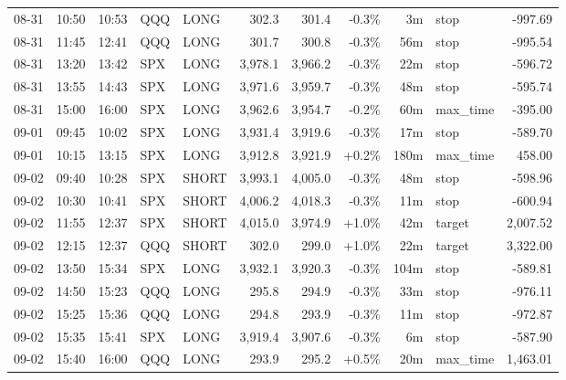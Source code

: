 \documentclass[11pt,a4paper,twoside]{article}
\begin{document}
\begin{center}
\begin{longtable}{>{\color{txtmain}}l l l l l r r r r >{\color{txtmain}}l r}
08-31 & 10:50 & 10:53 & QQQ & LONG & 302.3 & 301.4 & \textcolor{lossred}{-0.3\%} & 3m & stop & \textcolor{lossred}{-997.69} \\
08-31 & 11:45 & 12:41 & QQQ & LONG & 301.7 & 300.8 & \textcolor{lossred}{-0.3\%} & 56m & stop & \textcolor{lossred}{-995.54} \\
08-31 & 13:20 & 13:42 & SPX & LONG & 3,978.1 & 3,966.2 & \textcolor{lossred}{-0.3\%} & 22m & stop & \textcolor{lossred}{-596.72} \\
08-31 & 13:55 & 14:43 & SPX & LONG & 3,971.6 & 3,959.7 & \textcolor{lossred}{-0.3\%} & 48m & stop & \textcolor{lossred}{-595.74} \\
08-31 & 15:00 & 16:00 & SPX & LONG & 3,962.6 & 3,954.7 & \textcolor{lossred}{-0.2\%} & 60m & max\_time & \textcolor{lossred}{-395.00} \\
09-01 & 09:45 & 10:02 & SPX & LONG & 3,931.4 & 3,919.6 & \textcolor{lossred}{-0.3\%} & 17m & stop & \textcolor{lossred}{-589.70} \\
09-01 & 10:15 & 13:15 & SPX & LONG & 3,912.8 & 3,921.9 & \textcolor{wingreen}{+0.2\%} & 180m & max\_time & \textcolor{wingreen}{458.00} \\
09-02 & 09:40 & 10:28 & SPX & SHORT & 3,993.1 & 4,005.0 & \textcolor{lossred}{-0.3\%} & 48m & stop & \textcolor{lossred}{-598.96} \\
09-02 & 10:30 & 10:41 & SPX & SHORT & 4,006.2 & 4,018.3 & \textcolor{lossred}{-0.3\%} & 11m & stop & \textcolor{lossred}{-600.94} \\
09-02 & 11:55 & 12:37 & SPX & SHORT & 4,015.0 & 3,974.9 & \textcolor{wingreen}{+1.0\%} & 42m & target & \textcolor{wingreen}{2,007.52} \\
09-02 & 12:15 & 12:37 & QQQ & SHORT & 302.0 & 299.0 & \textcolor{wingreen}{+1.0\%} & 22m & target & \textcolor{wingreen}{3,322.00} \\
09-02 & 13:50 & 15:34 & SPX & LONG & 3,932.1 & 3,920.3 & \textcolor{lossred}{-0.3\%} & 104m & stop & \textcolor{lossred}{-589.81} \\
09-02 & 14:50 & 15:23 & QQQ & LONG & 295.8 & 294.9 & \textcolor{lossred}{-0.3\%} & 33m & stop & \textcolor{lossred}{-976.11} \\
09-02 & 15:25 & 15:36 & QQQ & LONG & 294.8 & 293.9 & \textcolor{lossred}{-0.3\%} & 11m & stop & \textcolor{lossred}{-972.87} \\
09-02 & 15:35 & 15:41 & SPX & LONG & 3,919.4 & 3,907.6 & \textcolor{lossred}{-0.3\%} & 6m & stop & \textcolor{lossred}{-587.90} \\
09-02 & 15:40 & 16:00 & QQQ & LONG & 293.9 & 295.2 & \textcolor{wingreen}{+0.5\%} & 20m & max\_time & \textcolor{wingreen}{1,463.01} \\

\end{longtable}
\end{center}
\end{document}
